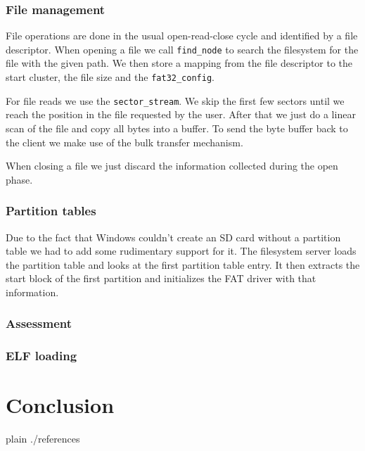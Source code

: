 \documentclass[a4paper,10pt]{article}
\begin{document}
\subsubsection{File management}

File operations are done in the usual open-read-close cycle and identified by a file descriptor.
When opening a file we call \lstinline!find_node! to search the filesystem for the file with the given path.
We then store a mapping from the file descriptor to the start cluster, the file size and the \lstinline!fat32_config!.

For file reads we use the \lstinline!sector_stream!.
We skip the first few sectors until we reach the position in the file requested by the user.
After that we just do a linear scan of the file and copy all bytes into a buffer.
To send the byte buffer back to the client we make use of the bulk transfer mechanism.

When closing a file we just discard the information collected during the open phase.

\subsubsection{Partition tables}

Due to the fact that Windows couldn't create an SD card without a partition table we had to add some rudimentary support for it.
The filesystem server loads the partition table and looks at the first partition table entry.
It then extracts the start block of the first partition and initializes the FAT driver with that information.

\subsubsection{Assessment}


\subsubsection{ ELF loading}


\section{Conclusion}

\begin{flushleft}
{{{
 {plain}
 {./references}
}}}
\end{flushleft}


\todos
\end{document}
